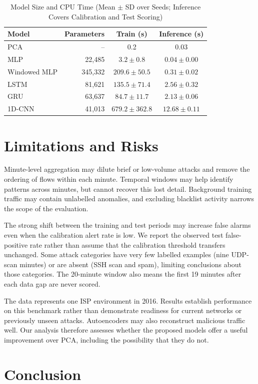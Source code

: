 \documentclass[conference]{IEEEtran}
\begin{document}
\begin{table}[htbp]
\caption{Model Size and CPU Time (Mean $\pm$ SD over Seeds; Inference Covers Calibration and Test Scoring)}
\begin{center}
\begin{tabular}{|l|r|c|c|}
\hline
\textbf{Model} & \textbf{Parameters} & \textbf{Train (s)} & \textbf{Inference (s)} \\
\hline
PCA & -- & 0.2 & 0.03 \\
MLP & 22,485 & $3.2 \pm 0.8$ & $0.04 \pm 0.00$ \\
Windowed MLP & 345,332 & $209.6 \pm 50.5$ & $0.31 \pm 0.02$ \\
LSTM & 81,621 & $135.5 \pm 71.4$ & $2.56 \pm 0.32$ \\
GRU & 63,637 & $84.7 \pm 11.7$ & $2.13 \pm 0.06$ \\
1D-CNN & 41,013 & $679.2 \pm 362.8$ & $12.68 \pm 0.11$ \\
\hline
\end{tabular}
\label{tab:cost}
\end{center}
\end{table}

\section{Limitations and Risks}
Minute-level aggregation may dilute brief or low-volume attacks and remove the ordering of flows within each minute. Temporal windows may help identify patterns across minutes, but cannot recover this lost detail. Background training traffic may contain unlabelled anomalies, and excluding blacklist activity narrows the scope of the evaluation.

The strong shift between the training and test periods may increase false alarms even when the calibration alert rate is low. We report the observed test false-positive rate rather than assume that the calibration threshold transfers unchanged. Some attack categories have very few labelled examples (nine UDP-scan minutes) or are absent (SSH scan and spam), limiting conclusions about those categories. The 20-minute window also means the first 19 minutes after each data gap are never scored.

The data represents one ISP environment in 2016. Results establish performance on this benchmark rather than demonstrate readiness for current networks or previously unseen attacks. Autoencoders may also reconstruct malicious traffic well. Our analysis therefore assesses whether the proposed models offer a useful improvement over PCA, including the possibility that they do not.

\section{Conclusion}



\end{document}
